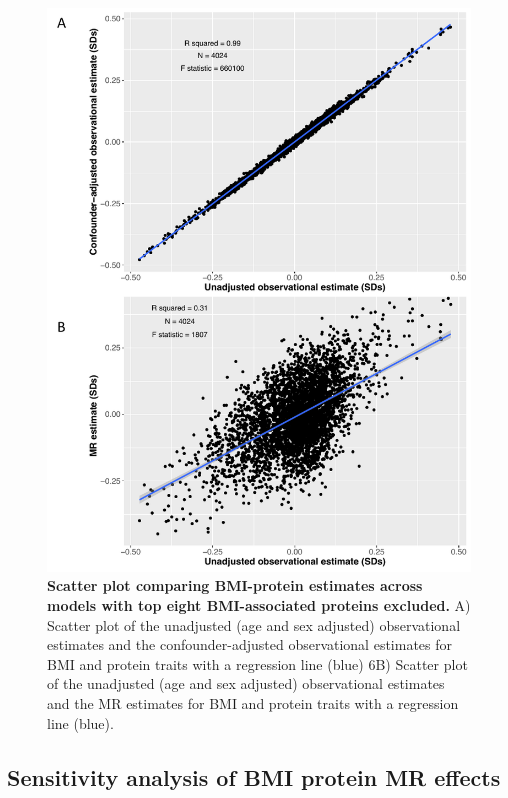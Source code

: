 \documentclass[11pt,twoside]{bristolthesis}
\begin{document}
\begin{figure}

{\centering \includegraphics[width=0.8\linewidth]{figure/BMI_protein_INTERVAL/Obs_MR_scatter_without_top8} 

}

\caption[Scatter plot comparing BMI-protein estimates across models with top eight BMI-associated proteins excluded]{\textbf{Scatter plot comparing BMI-protein estimates across models with top eight BMI-associated proteins excluded.} A) Scatter plot of the unadjusted (age and sex adjusted) observational estimates and the confounder-adjusted observational estimates for BMI and protein traits with a regression line (blue) 6B) Scatter plot of the unadjusted (age and sex adjusted) observational estimates and the MR estimates for BMI and protein traits with a regression line (blue).}\label{fig:Obs-MR-without-top8}
\end{figure}
\hypertarget{sensitivity-analysis-of-bmi-protein-mr-effects}{%
\subsection{Sensitivity analysis of BMI protein MR effects}\label{sensitivity-analysis-of-bmi-protein-mr-effects}}
\end{document}
